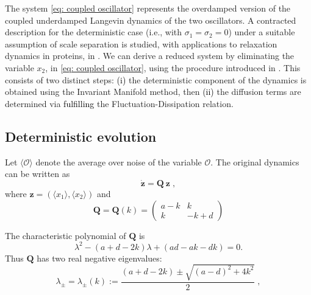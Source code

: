 \documentclass[a4paper,twoside]{article}      %
\theoremstyle{definition}
\newcommand{\AM}{\textcolor{black}}
\begin{document}
The system \eqref{eq: coupled oscillator} represents the overdamped version of the coupled underdamped Langevin dynamics of the two oscillators. A contracted description for the deterministic case (i.e., with $\sigma_1=\sigma_2=0$) under a suitable assumption of scale separation is studied, with applications to relaxation dynamics in proteins, in \cite{Soheilifard2011}. We can derive a reduced system by eliminating the variable $x_2$, in \eqref{eq: coupled oscillator}, using the procedure introduced in \cite{CM22,CDM22}. This consists of two distinct steps: \AM{(i)} the
deterministic component of the dynamics is obtained using the Invariant Manifold method, then \AM{(ii)} the diffusion terms are determined
via \AM{fulfilling} the Fluctuation-Dissipation relation. 

\subsection{Deterministic evolution}
Let $\langle \mathcal{O}\rangle$ denote the average over noise of the variable $\mathcal{O}$. The original dynamics can be written as
\begin{equation}
\dot{\mathbf{z}}=\mathbf{Q}~ \mathbf{z} \;, \label{orig}
\end{equation}
where $\mathbf{z}=(\langle x_1\rangle, \langle x_2\rangle)$ and
\begin{equation}
\label{eq: Q}
\mathbf{Q}=\mathbf{Q}(k)=\begin{pmatrix}
a-k&k\\ k &-k+d
\end{pmatrix}    
\end{equation}

The characteristic polynomial of $\mathbf{Q}$ is
$$
\lambda^2-(a+d-2k)\lambda+(ad-ak-dk)=0.
$$
Thus $\mathbf{Q}$ has two real negative eigenvalues:
\begin{equation}
\label{eq: lambda}
\lambda_{\pm}=\lambda_{\pm}(k):=\frac{(a+d-2k)\pm \sqrt{(a-d)^2+4k^2}}{2} \;,
\end{equation}
\end{document}
